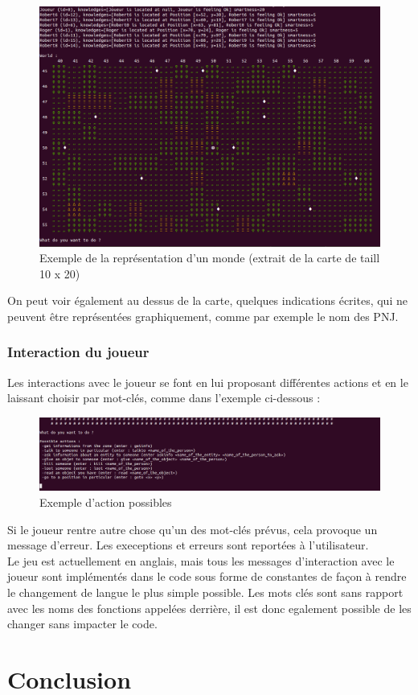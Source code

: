 \documentclass[asi]{picINSA}
\begin{document}
\begin{figure}[!ht]
  \begin{center}
    \includegraphics[width=1\textwidth]{images/screenshootWorld01.png}
    \caption{Exemple de la représentation d'un monde (extrait de la carte de taill 10 x 20)}	
  \end{center}
\end{figure}
 On peut voir également au dessus de la carte, quelques indications écrites, qui ne peuvent être représentées graphiquement, comme par exemple le nom des PNJ.
\subsection{Interaction du joueur}
Les interactions avec le joueur se font en lui proposant différentes actions et en le laissant choisir par mot-clés, comme dans l'exemple ci-dessous : \\
\begin{figure}[!ht]
  \begin{center}
    \includegraphics[width=1\textwidth]{images/screenshootUI01.png}
    \caption{Exemple d'action possibles}	
  \end{center}
\end{figure}

Si le joueur rentre autre chose qu'un des mot-clés prévus, cela provoque un message d'erreur. Les  execeptions et erreurs sont reportées à l'utilisateur. \\

Le jeu est actuellement en anglais, mais tous les messages d'interaction avec le joueur sont implémentés dans le code sous forme de constantes de façon à rendre le changement de langue le plus simple possible. Les mots clés sont sans rapport avec les noms des fonctions appelées derrière, il est donc egalement possible de les changer sans impacter le code.


\chapter{Conclusion}


  
\end{document}
